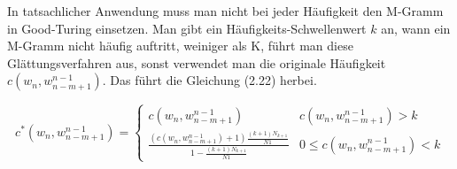 In tatsachlicher Anwendung muss man nicht bei jeder H\"aufigkeit den M-Gramm in Good-Turing einsetzen. Man gibt ein H\"aufigkeits-Schwellenwert $k$ an, wann ein M-Gramm nicht h\"aufig auftritt, weiniger als K, f\"uhrt man diese Gl\"attungsverfahren aus, sonst verwendet man die originale H\"aufigkeit $c(w_{n},w_{n-m+1}^{n-1})$. Das f\"uhrt die Gleichung (2.22) herbei.

\begin{equation}
\label{equationo:witten_bell_04}
c^{*}(w_{n},w_{n-m+1}^{n-1})=\begin{cases}
c(w_{n},w_{n-m+1}^{n-1}) & c(w_{n},w_{n-m+1}^{n-1})>k \\
\frac{(c(w_{n},w_{n-m+1}^{n-1})+1)\frac{(k+1)N_{k+1}}{N{1}}}{1-\frac{(k+1)N_{k+1}}{N{1}}} & 0 \leq c(w_{n},w_{n-m+1}^{n-1})<k 
\end{cases}
\end{equation}